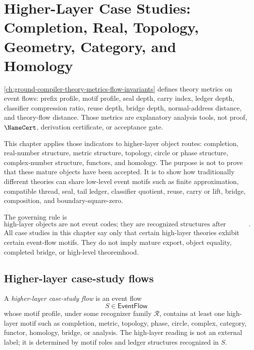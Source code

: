 \chapter{Higher-Layer Case Studies: Completion, Real, Topology, Geometry, Category, and Homology}
\label{ch:ground-compiler-higher-layer-case-studies}

\autoref{ch:ground-compiler-theory-metrics-flow-invariants} defines theory metrics on event flows: prefix profile, motif profile, seal depth, carry index, ledger depth, classifier compression ratio, reuse depth, bridge depth, normal-address distance, and theory-flow distance. Those metrics are explanatory analysis tools, not proof, $\NameCert$, derivation certificate, or acceptance gate.

This chapter applies those indicators to higher-layer object routes: completion, real-number structure, metric structure, topology, circle or phase structure, complex-number structure, functors, and homology. The purpose is not to prove that these mature objects have been accepted. It is to show how traditionally different theories can share low-level event motifs such as finite approximation, compatible thread, seal, tail ledger, classifier quotient, reuse, carry or lift, bridge, composition, and boundary-square-zero.

The governing rule is
$$
  \boxed{\text{high-layer objects are not event codes; they are recognized structures after certificates, classifiers, ledgers, and gates}.}
$$
All case studies in this chapter say only that certain high-layer theories exhibit certain event-flow motifs. They do not imply mature export, object equality, completed bridge, or high-level theoremhood.

\section{Higher-layer case-study flows}
\label{sec:higher-case-flows}

\begin{definition}
\label{def:higher-case-flow}
A \emph{higher-layer case-study flow} is an event flow
$$
  S\in\mathsf{EventFlow}
$$
whose motif profile, under some recognizer family $\mathcal R$, contains at least one high-layer motif such as completion, metric, topology, phase, circle, complex, category, functor, homology, bridge, or analysis. The high-layer reading is not an external label; it is determined by motif roles and ledger structures recognized in $S$.
\end{definition}

